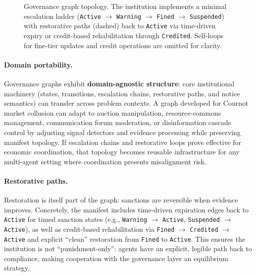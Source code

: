 \documentclass[11pt, a4paper]{article}
\begin{document}
\begin{figure}[t]
{%
    }
    \caption{Governance graph topology. The institution implements a minimal escalation ladder (\texttt{Active} $\rightarrow$ \texttt{Warning} $\rightarrow$ \texttt{Fined} $\rightarrow$ \texttt{Suspended}) with restorative paths (dashed) back to \texttt{Active} via time-driven expiry or credit-based rehabilitation through \texttt{Credited}. Self-loops for fine-tier updates and credit operations are omitted for clarity.}
    \label{fig:institution_topology}
\end{figure}

\paragraph{Domain portability.}
Governance graphs exhibit \textbf{domain-agnostic structure}: core institutional machinery (states, transitions, escalation chains, restorative paths, and notice semantics) can transfer across problem contexts. A graph developed for Cournot market collusion can adapt to auction manipulation, resource-commons management, communication forum moderation, or disinformation cascade control by adjusting signal detectors and evidence processing while preserving manifest topology. If escalation chains and restorative loops prove effective for economic coordination, that topology becomes reusable infrastructure for any multi-agent setting where coordination presents misalignment risk.

\paragraph{Restorative paths.}
Restoration is itself part of the graph: sanctions are reversible when evidence improves. Concretely, the manifest includes time-driven expiration edges back to \texttt{Active} for timed sanction states (e.g., \texttt{Warning} $\rightarrow$ \texttt{Active}, \texttt{Suspended} $\rightarrow$ \texttt{Active}), as well as credit-based rehabilitation via \texttt{Fined} $\rightarrow$ \texttt{Credited} $\rightarrow$ \texttt{Active} and explicit ``clean'' restoration from \texttt{Fined} to \texttt{Active}. This ensures the institution is not “punishment-only”: agents have an explicit, legible path back to compliance, making cooperation with the governance layer an equilibrium strategy.
\end{document}
